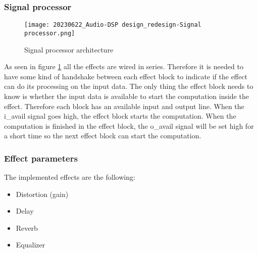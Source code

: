 

\subsubsection{Signal processor}
\begin{figure}[ht]
    \texttt{[image: 20230622\_Audio-DSP design\_redesign-Signal processor.png]}
    \caption{Signal processor architecture}
    \label{fig:arch-signal-processor}
\end{figure}

As seen in figure \ref{fig:arch-signal-processor} all the effects are wired in series. Therefore it is needed to have some kind of handshake between each effect block to indicate if the effect can do its processing on the input data. The only thing the effect block needs to know is whether the input data is available to start the computation inside the effect. Therefore each block has an available input and output line. When the i\_avail signal goes high, the effect block starts the computation. When the computation is finished in the effect block, the o\_avail signal will be set high for a short time so the next effect block can start the computation.

\subsubsection{Effect parameters}
The implemented effects are the following:

\begin{itemize}
    \setlength\itemsep{-0.3em} %
    \item Distortion (gain)
    \item Delay
    \item Reverb
    \item Equalizer
\end{itemize}

